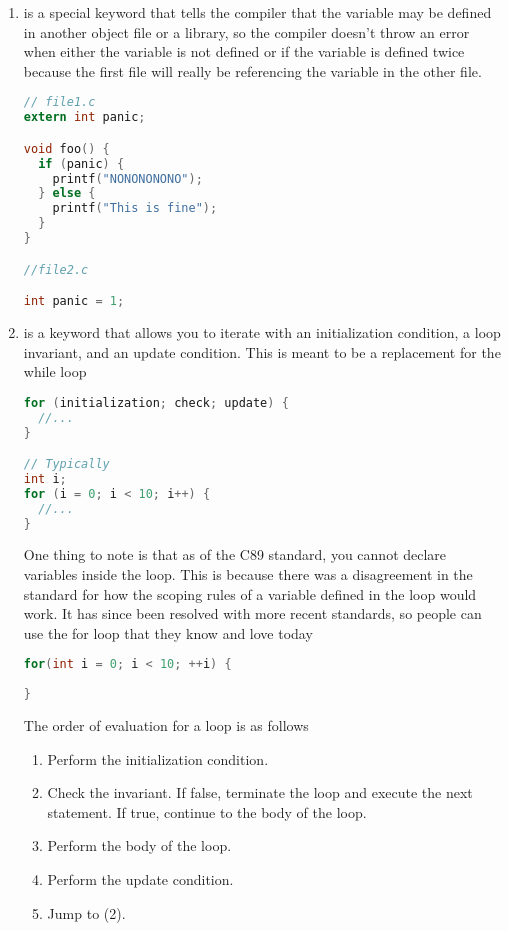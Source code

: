 \begin{enumerate}
\begin{lstlisting}[language=C]
void process_day(enum day foo) {
  switch(day) {
    case monday:
      printf("Go home!\n"); break;
    // ...
  }
}
\end{lstlisting}

\item {} is a special keyword that tells the compiler that the variable may be defined in another object file or a library, so the compiler doesn't throw an error when either the variable is not defined or if the variable is defined twice because the first file will really be referencing the variable in the other file.

\begin{lstlisting}[language=C]
// file1.c
extern int panic;

void foo() {
  if (panic) {
    printf("NONONONONO");
  } else {
    printf("This is fine");
  }
}

//file2.c

int panic = 1;
\end{lstlisting}

\item {} is a keyword that allows you to iterate with an initialization condition, a loop invariant, and an update condition. This is meant to be a replacement for the while loop

\begin{lstlisting}[language=C]
for (initialization; check; update) {
  //...
}

// Typically
int i;
for (i = 0; i < 10; i++) {
  //...
}
\end{lstlisting}

One thing to note is that as of the C89 standard, you cannot declare variables inside the  loop. This is because there was a disagreement in the standard for how the scoping rules of a variable defined in the loop would work. It has since been resolved with more recent standards, so people can use the for loop that they know and love today

\begin{lstlisting}[language=C]
for(int i = 0; i < 10; ++i) {
  
}
\end{lstlisting}

The order of evaluation for a  loop is as follows

\begin{enumerate}
\item Perform the initialization condition.
\item Check the invariant. If false, terminate the loop and execute the next statement. If true, continue to the body of the loop.
\item Perform the body of the loop.
\item Perform the update condition.
\item Jump to (2).
\end{enumerate}


\end{enumerate}
